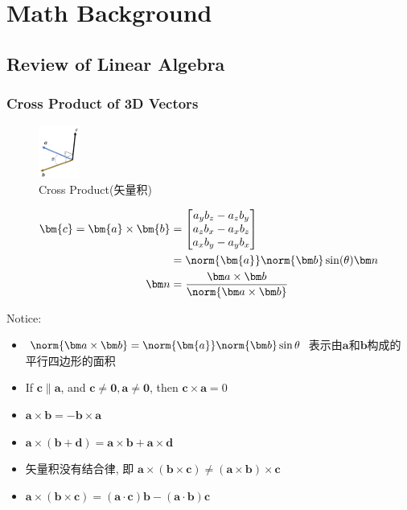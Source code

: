 \newpage
\section{Math Background}
\subsection{Review of Linear Algebra}
\subsubsection{Cross Product of 3D Vectors}


\begin{figure}[!htb]
    \centering
    \includegraphics[width=0.12\textwidth]{pic/1052/Cross Product.png}
    \caption{Cross Product(矢量积)}
\end{figure}


\begin{align*}
    \bm{c}=\bm{a}\times\bm{b}&=\begin{bmatrix}
        a_yb_z-a_zb_y\\
        a_zb_x-a_xb_z\\
        a_xb_y-a_yb_x
    \end{bmatrix}\\
    &=\norm{\bm{a}}\norm{\bm b}\sin(\theta) \bm n\\
    \bm n &= \frac{\bm a \times \bm b}{\norm{\bm a \times \bm b}}
\end{align*}

Notice:
\begin{itemize}
    \item $\norm{\bm a \times \bm b}=\norm{\bm{a}}\norm{\bm b}\sin\theta$ 表示由$\bm a$和$\bm b$构成的平行四边形的面积
    \item If $\bm c \parallel  \bm a$, and $\bm c \ne \bm 0, \bm a \ne \bm 0$, then $\bm c \times \bm a = 0$
    \item $\bm a \times \bm b = - \bm b \times \bm a $
    \item $\bm a \times(\bm b + \bm d )=\bm a \times \bm b + \bm a \times \bm d$
    \item 矢量积没有结合律, 即 $\bm a \times(\bm b \times \bm c)\ne (\bm a \times\bm b) \times \bm c$
    \item $\bm a \times(\bm b \times \bm c)=(\bm a \cdot \bm c)\bm b - (\bm a \cdot \bm b)\bm c$
\end{itemize}

